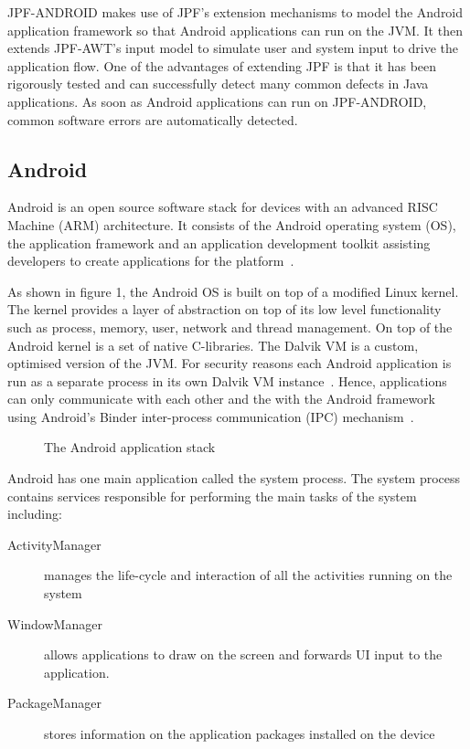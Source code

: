\documentclass{acm_proc_article-sp}
\begin{document}
JPF-ANDROID makes use of JPF's extension mechanisms to model the Android application framework so that Android applications can run on the
JVM. It then extends JPF-AWT's input model to simulate user and system input to drive the application flow. One of the advantages of
extending JPF is that it has been rigorously tested and can successfully detect many common defects in Java applications. As soon as Android
applications can run on JPF-ANDROID, common software errors are automatically detected.


\subsection{Android}
Android is an open source software stack for devices with an advanced RISC Machine (ARM) architecture.
It consists of the Android operating system (OS), the application framework and an application development toolkit assisting developers to create
applications for the platform~\cite{AndroidDocs}.

As shown in figure 1, the Android OS is built on top of a modified Linux kernel. The kernel provides a layer of abstraction on top of its
low level functionality such as process, memory, user, network and thread management. On top of the Android kernel is a set of native
C-libraries. The Dalvik VM is a custom, optimised version of the JVM. For security reasons each Android application is run as a separate
process in its own Dalvik VM instance~\cite{AndroidSecurity}.  Hence, applications can only communicate with each other and the with the
Android framework using Android's Binder inter-process communication (IPC) mechanism~\cite{Binder}. 

\begin{figure}
\centering
{}
\caption{The Android application stack~\cite{systemserver}}
\end{figure}

Android has one main application called the system process. The system process contains services responsible for performing the main
tasks of the system including:
\begin{description}
 \item [ActivityManager] manages the life-cycle and interaction of all the activities running on the system
 \item [WindowManager] allows applications to draw on the screen and forwards UI input to the application.
 \item [PackageManager] stores information on the application packages installed on the device
\end{description}
\end{document}
